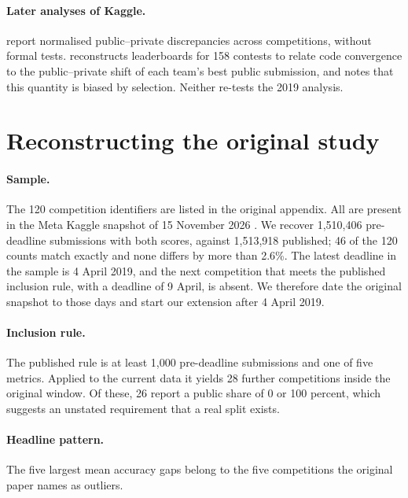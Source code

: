 \documentclass[10pt]{article}
\begin{document}
\paragraph{Later analyses of Kaggle.} \citet{bonisch2025chronicles} report normalised public--private discrepancies across competitions, without formal tests. \citet{burtch2026monoculture} reconstructs leaderboards for 158 contests to relate code convergence to the public--private shift of each team's best public submission, and notes that this quantity is biased by selection. Neither re-tests the 2019 analysis.

\section{Reconstructing the original study}
\label{sec:recon}

\paragraph{Sample.} The 120 competition identifiers are listed in the original appendix. All are present in the Meta Kaggle snapshot of 15 November 2026 \citep{metakaggle}. We recover 1,510,406 pre-deadline submissions with both scores, against 1,513,918 published; 46 of the 120 counts match exactly and none differs by more than 2.6\%. The latest deadline in the sample is 4 April 2019, and the next competition that meets the published inclusion rule, with a deadline of 9 April, is absent. We therefore date the original snapshot to those days and start our extension after 4 April 2019.

\paragraph{Inclusion rule.} The published rule is at least 1,000 pre-deadline submissions and one of five metrics. Applied to the current data it yields 28 further competitions inside the original window. Of these, 26 report a public share of 0 or 100 percent, which suggests an unstated requirement that a real split exists.

\paragraph{Headline pattern.} The five largest mean accuracy gaps belong to the five competitions the original paper names as outliers.
\end{document}
